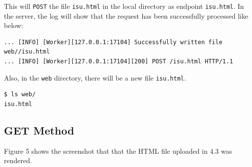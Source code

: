 \documentclass{homework}
\begin{document}
This will \texttt{POST} the file \texttt{isu.html} in the local directory as endpoint \texttt{isu.html}. In the server, the log will show that the request has been successfully processed like below:
\\
\begin{center}
\begin{code}
\begin{verbatim}
... [INFO] [Worker][127.0.0.1:17104] Successfully written file web//isu.html
... [INFO] [Worker][127.0.0.1:17104][200] POST /isu.html HTTP/1.1
\end{verbatim}
\end{code}
\end{center}

Also, in the \texttt{web} directory, there will be a new file \texttt{isu.html}.
\\
\begin{center}
\begin{code}
\begin{verbatim}
$ ls web/
isu.html
\end{verbatim}
\end{code}
\end{center}


\pagebreak
\subsection{GET Method}
Figure 5 shows the screenshot that that the HTML file uploaded in 4.3 was rendered.
\end{document}
